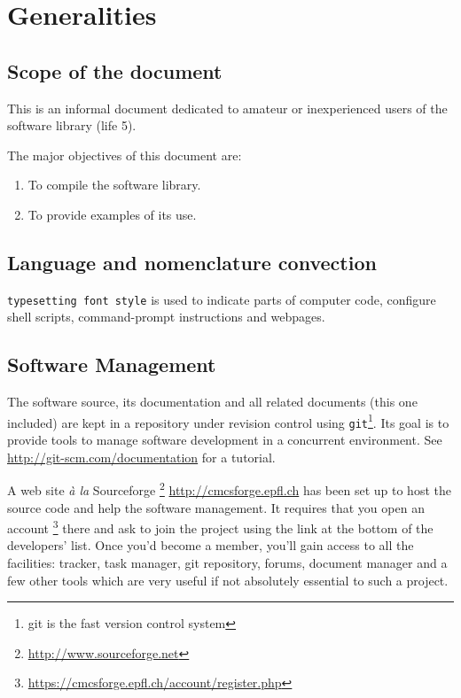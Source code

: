 
\chapter{Generalities}
\label{cha:generalities}

\section{Scope of the document}
\label{sec:scope-document}

This is an informal document dedicated to amateur or inexperienced users of the 
software library \thelibrary (life 5). 

The major objectives of this document are:
\begin{enumerate}
\item To compile the software library.
\item To provide examples of its use.
\end{enumerate}

\section{Language and nomenclature convection}
\label{sec:lang-nomencl-conv}

\texttt{typesetting font style} is used to indicate parts of
computer code, configure shell scripts, command-prompt instructions and webpages.

\section{Software Management}
\label{sec:software-management}

The software source, its documentation and all related documents (this
one included) are kept in a repository under revision control
using \verb!git!\footnote{git is the fast version control system}. Its goal
is to provide tools to manage software development in a concurrent environment.
See \url{http://git-scm.com/documentation}
for a tutorial.

A web site {\it\`a la} Sourceforge
\footnote{\url{http://www.sourceforge.net}} 
\url{http://cmcsforge.epfl.ch} has been set up 
to host the source code and help the software management.
It requires that you open an account 
\footnote{\url{https://cmcsforge.epfl.ch/account/register.php}} 
there and ask to join the project \lifev using the link at the 
bottom of the developers' list.
Once you'd become a member, you'll gain access to all the facilities: 
tracker, task manager, git repository, forums, document manager and a few other 
tools which are very useful if not absolutely essential to such a project.

